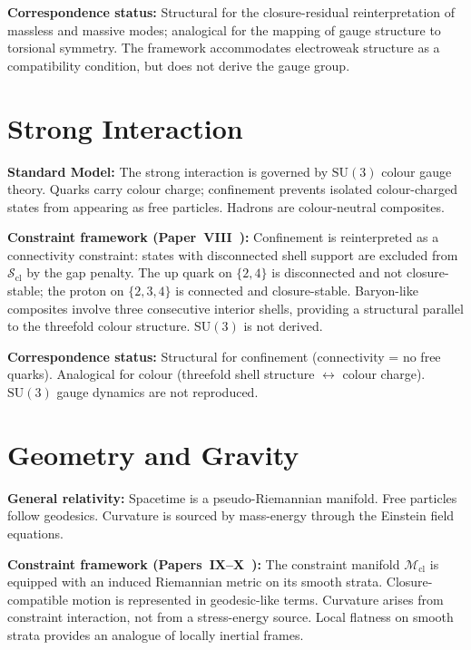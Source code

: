 \documentclass[12pt]{article}
\newcommand{\Mcl}{\mathcal{M}_{\mathrm{cl}}}
\newcommand{\Scl}{\mathcal{S}_{\mathrm{cl}}}
\begin{document}
\textbf{Correspondence status:} Structural for the closure-residual reinterpretation of massless and massive modes; analogical for the mapping of gauge structure to torsional symmetry. The framework accommodates electroweak structure as a compatibility condition, but does not derive the gauge group.

\section{Strong Interaction}\label{sec:strong}

\textbf{Standard Model:} The strong interaction is governed by $\mathrm{SU}(3)$ colour gauge theory. Quarks carry colour charge; confinement prevents isolated colour-charged states from appearing as free particles. Hadrons are colour-neutral composites.

\textbf{Constraint framework (Paper~VIII~\citep{SmartVIII}):} Confinement is reinterpreted as a connectivity constraint: states with disconnected shell support are excluded from $\Scl$ by the gap penalty. The up quark on $\{2,4\}$ is disconnected and not closure-stable; the proton on $\{2,3,4\}$ is connected and closure-stable. Baryon-like composites involve three consecutive interior shells, providing a structural parallel to the threefold colour structure. $\mathrm{SU}(3)$ is not derived.

\textbf{Correspondence status:} Structural for confinement (connectivity = no free quarks). Analogical for colour (threefold shell structure $\leftrightarrow$ colour charge). $\mathrm{SU}(3)$ gauge dynamics are not reproduced.

\section{Geometry and Gravity}\label{sec:gravity}

\textbf{General relativity:} Spacetime is a pseudo-Riemannian manifold. Free particles follow geodesics. Curvature is sourced by mass-energy through the Einstein field equations.

\textbf{Constraint framework (Papers~IX--X~\citep{SmartIX, SmartX}):} The constraint manifold $\Mcl$ is equipped with an induced Riemannian metric on its smooth strata. Closure-compatible motion is represented in geodesic-like terms. Curvature arises from constraint interaction, not from a stress-energy source. Local flatness on smooth strata provides an analogue of locally inertial frames.
\end{document}
